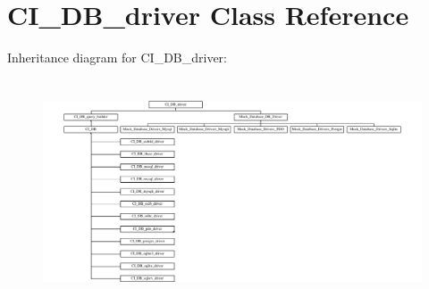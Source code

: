 \hypertarget{class_c_i___d_b__driver}{}\section{C\+I\+\_\+\+D\+B\+\_\+driver Class Reference}
\label{class_c_i___d_b__driver}
Inheritance diagram for C\+I\+\_\+\+D\+B\+\_\+driver\+:\begin{figure}[H]
\begin{center}
\leavevmode
\includegraphics[height=6.666666cm]{class_c_i___d_b__driver}
\end{center}
\end{figure}
